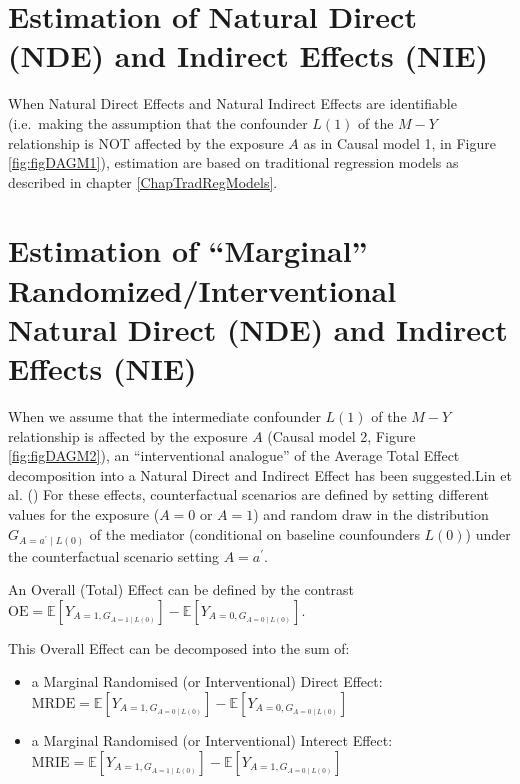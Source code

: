 \documentclass[
]{book}
\providecommand{\tightlist}{%
  \setlength{\itemsep}{0pt}\setlength{\parskip}{0pt}}
\begin{document}
\section{Estimation of Natural Direct (NDE) and Indirect Effects (NIE)}\label{estimation-of-natural-direct-nde-and-indirect-effects-nie}

When Natural Direct Effects and Natural Indirect Effects are identifiable (i.e.~making the assumption that the confounder \(L(1)\) of the \(M-Y\) relationship is NOT affected by the exposure \(A\) as in Causal model 1, in Figure \ref{fig:figDAGM1}), estimation are based on traditional regression models as described in chapter \ref{ChapTradRegModels}.

\section{Estimation of ``Marginal'' Randomized/Interventional Natural Direct (NDE) and Indirect Effects (NIE)}\label{estimation-of-marginal-randomizedinterventional-natural-direct-nde-and-indirect-effects-nie}

When we assume that the intermediate confounder \(L(1)\) of the \(M-Y\) relationship is affected by the exposure \(A\) (Causal model 2, Figure \ref{fig:figDAGM2}), an ``interventional analogue'' of the Average Total Effect decomposition into a Natural Direct and Indirect Effect has been suggested.Lin et al. () For these effects, counterfactual scenarios are defined by setting different values for the exposure (\(A = 0\) or \(A=1\)) and random draw in the distribution \(G_{A=a^\prime \mid L(0)}\) of the mediator (conditional on baseline counfounders \(L(0)\)) under the counterfactual scenario setting \(A=a^\prime\).

An Overall (Total) Effect can be defined by the contrast \(\text{OE} = \mathbb{E}\left[Y_{A=1,G_{A=1\mid L(0)}} \right] - \mathbb{E}\left[ Y_{A=0,G_{A=0\mid L(0)}} \right]\).

This Overall Effect can be decomposed into the sum of:

\begin{itemize}
\tightlist
\item
  a Marginal Randomised (or Interventional) Direct Effect: \(\text{MRDE}=\mathbb{E}\left[Y_{A=1,G_{A=0\mid L(0)}} \right] - \mathbb{E}\left[ Y_{A=0,G_{A=0\mid L(0)}} \right]\)
\item
  a Marginal Randomised (or Interventional) Interect Effect: \(\text{MRIE}=\mathbb{E}\left[Y_{A=1,G_{A=1\mid L(0)}} \right] - \mathbb{E}\left[ Y_{A=1,G_{A=0\mid L(0)}} \right]\)
\end{itemize}
\end{document}
